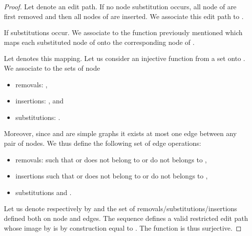 \begin{proof}
  Let  denote an edit path. If no node substitution occurs, all
  node of  are first removed and then all nodes of 
  are inserted. We associate this edit path to . 

  If substitutions occur. We associate to  the function previously
  mentioned which maps each substituted node of  onto the
  corresponding node of . 

  Let  denotes this mapping. Let us consider an injective
  function  from a set  onto .  We
  associate to  the sets of node
  \begin{itemize}
  \item removals: ,
  \item insertions:  , and
  \item substitutions: .   
  \end{itemize}
  Moreover, since  and  are simple graphs it exists at most
  one edge between any pair of nodes. We thus define the following
  set of edge operations:
  \begin{itemize}
  \item removals:  such that  or  does not belong to  or  do not belongs to ,
  \item insertions  such that  or  does not belong to  or  do not belongs to ,

  \item substitutions  and .
  \end{itemize}
  Let us denote respectively by  and  the set of
  removals/substitutions/insertions defined both on node and
  edges. The sequence  defines a valid restricted edit path whose image
  by  is by construction equal to . The function  is
  thus surjective.


\end{proof}
